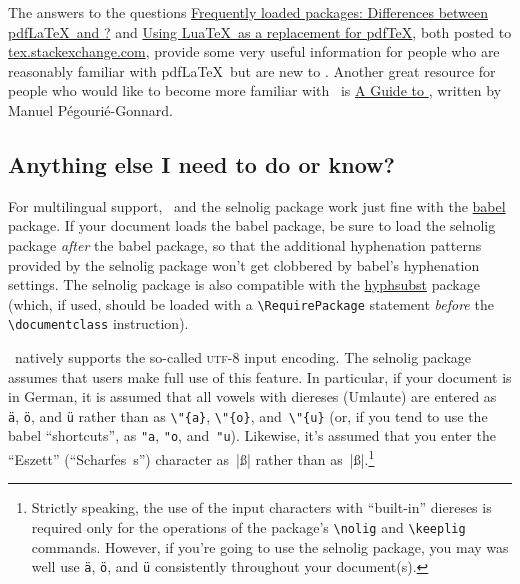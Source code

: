 \documentclass[12pt]{article}
\newcommand{\pkg}[1]{\textsf{#1}}
\newcommand{\cmmd}[1]{\texttt{\textbackslash #1}}
\begin{document}
The answers to the questions \href{http://tex.stackexchange.com/q/28642/5001}{Frequently loaded packages: Differences between pdf\LaTeX\ and \LuaLaTeX?} and \href{http://tex.stackexchange.com/q/32295/5001}{Using Lua\TeX\ as a replacement for pdf\TeX}, both posted to \href{http://tex.stackexchange.com/}{tex.stackexchange.com}, provide some very useful information for people who are reasonably familiar with pdf\LaTeX\ but are new to \LuaLaTeX. Another great resource for people who would like to become more familiar with \LuaLaTeX\ is  \href{http://mirror.ctan.org/info/luatex/lualatex-doc/lualatex-doc.pdf}{A Guide to \LuaLaTeX}, written by Manuel Pégourié-Gonnard.


\subsection{Anything else I need to do or know?} \label{sec:anythingelse}

For multilingual support, \LuaLaTeX\ and the \pkg{selnolig} package work just fine with the \href{http://www.ctan.org/pkg/babel}{\pkg{babel}} package. If your document loads the \pkg{babel} package, be sure to load the \pkg{selnolig} package \emph{after} the \pkg{babel} package, so that the additional hyphenation patterns provided by the \pkg{selnolig} package won't get clobbered by \pkg{babel}'s hyphenation settings. The \pkg{selnolig} package is also compatible with the \href{http://www.ctan.org/pkg/hyphsubst}{\pkg{hyphsubst}} package (which, if used, should be loaded with a \Verb+\RequirePackage+ statement \emph{before} the \Verb+\documentclass+ instruction).

\LuaLaTeX\ natively supports the so-called \textsc{utf}-8 input encoding. The \pkg{selnolig} package assumes that users make full use of this feature. In particular, if your document is in German, it is assumed that all vowels with diereses (Umlaute) are entered as \Verb|ä|, \Verb|ö|, and \Verb|ü| rather than as \Verb|\"{a}|, \Verb|\"{o}|, and~\Verb|\"{u}| (or, if you tend to use the \pkg{babel} \enquote{shortcuts}, as \Verb|"a|, \Verb|"o|, and~\Verb|"u|). Likewise, it's assumed that you enter the \enquote{Eszett} (\enquote{Scharfes~s}) character as~|ß| rather than as~|{\ss}|.\footnote{Strictly speaking, the use of the input characters with \enquote{built-in} diereses is required only for the operations of the package's \cmmd{nolig} and \cmmd{keeplig} commands. However, if you're going to use the \pkg{selnolig} package, you may was well use \Verb|ä|, \Verb|ö|, and \Verb|ü| consistently throughout your document(s).}
\end{document}
